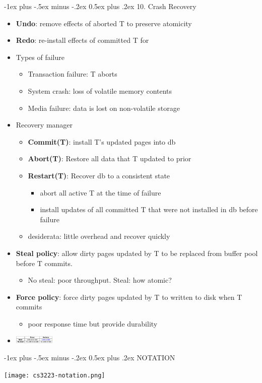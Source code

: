 \documentclass[9pt, landscape]{extarticle}
\makeatletter
\renewcommand{\section}{\@startsection{section}{1}{0mm}%
  {-1ex plus -.5ex minus -.2ex}%
  {0.5ex plus .2ex}%
{\normalfont\large\bfseries}}
\makeatother
\begin{document}
\begin{multicols*}{4}
  \section{10. Crash Recovery}
  \begin{itemize}
    \item \textbf{Undo}: remove effects of aborted T to preserve atomicity
    \item \textbf{Redo}: re-install effects of committed T for
    \item Types of failure
    \begin{itemize}
      \item Transaction failure: T aborts
      \item System crash: loss of volatile memory contents
      \item Media failure: data is lost on non-volatile storage
    \end{itemize}
    \item Recovery manager
    \begin{itemize}
      \item \textbf{Commit(T)}: install T's updated pages into db
      \item \textbf{Abort(T)}: Restore all data that T updated to prior
      \item \textbf{Restart(T)}: Recover db to a consistent state
      \begin{itemize}
        \item abort all active T at the time of failure
        \item install updates of all committed T that were not installed in db before failure
      \end{itemize}
      \item desiderata: little overhead and recover quickly
    \end{itemize}
    \item \textbf{Steal policy}: allow dirty pages updated by T to be replaced from buffer pool before T commits.
    \begin{itemize}
      \item No steal: poor throughput. Steal: how atomic?
    \end{itemize}
    \item \textbf{Force policy}: force dirty pages updated by T to written to disk when T commits
    \begin{itemize}
      \item poor response time but provide durability
    \end{itemize}
    \item \includegraphics[width=0.15\textwidth]{cs3223-steal-force.png}
  \end{itemize}

  
  \section{NOTATION}


  \texttt{[image: cs3223-notation.png]} 


\end{multicols*}
\end{document}
